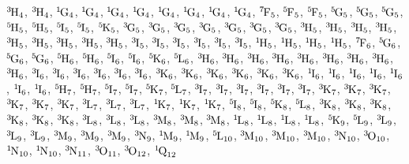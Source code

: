 \begin{mdframed}
\begin{center}
$\LSJterm{3}{H}{4}$, $\LSJterm{3}{H}{4}$, $\LSJterm{1}{G}{4}$, $\LSJterm{1}{G}{4}$, $\LSJterm{1}{G}{4}$, $\LSJterm{1}{G}{4}$, $\LSJterm{1}{G}{4}$, $\LSJterm{1}{G}{4}$, $\LSJterm{1}{G}{4}$, $\LSJterm{1}{G}{4}$, $\LSJterm{7}{F}{5}$, $\LSJterm{5}{F}{5}$, $\LSJterm{5}{F}{5}$, $\LSJterm{5}{G}{5}$, $\LSJterm{5}{G}{5}$, $\LSJterm{5}{G}{5}$, $\LSJterm{5}{H}{5}$, $\LSJterm{5}{H}{5}$, $\LSJterm{5}{I}{5}$, $\LSJterm{5}{I}{5}$, $\LSJterm{5}{K}{5}$, $\LSJterm{3}{G}{5}$, $\LSJterm{3}{G}{5}$, $\LSJterm{3}{G}{5}$, $\LSJterm{3}{G}{5}$, $\LSJterm{3}{G}{5}$, $\LSJterm{3}{G}{5}$, $\LSJterm{3}{G}{5}$, $\LSJterm{3}{H}{5}$, $\LSJterm{3}{H}{5}$, $\LSJterm{3}{H}{5}$, $\LSJterm{3}{H}{5}$, $\LSJterm{3}{H}{5}$, $\LSJterm{3}{H}{5}$, $\LSJterm{3}{H}{5}$, $\LSJterm{3}{H}{5}$, $\LSJterm{3}{H}{5}$, $\LSJterm{3}{I}{5}$, $\LSJterm{3}{I}{5}$, $\LSJterm{3}{I}{5}$, $\LSJterm{3}{I}{5}$, $\LSJterm{3}{I}{5}$, $\LSJterm{3}{I}{5}$, $\LSJterm{1}{H}{5}$, $\LSJterm{1}{H}{5}$, $\LSJterm{1}{H}{5}$, $\LSJterm{1}{H}{5}$, $\LSJterm{7}{F}{6}$, $\LSJterm{5}{G}{6}$, $\LSJterm{5}{G}{6}$, $\LSJterm{5}{G}{6}$, $\LSJterm{5}{H}{6}$, $\LSJterm{5}{H}{6}$, $\LSJterm{5}{I}{6}$, $\LSJterm{5}{I}{6}$, $\LSJterm{5}{K}{6}$, $\LSJterm{5}{L}{6}$, $\LSJterm{3}{H}{6}$, $\LSJterm{3}{H}{6}$, $\LSJterm{3}{H}{6}$, $\LSJterm{3}{H}{6}$, $\LSJterm{3}{H}{6}$, $\LSJterm{3}{H}{6}$, $\LSJterm{3}{H}{6}$, $\LSJterm{3}{H}{6}$, $\LSJterm{3}{H}{6}$, $\LSJterm{3}{I}{6}$, $\LSJterm{3}{I}{6}$, $\LSJterm{3}{I}{6}$, $\LSJterm{3}{I}{6}$, $\LSJterm{3}{I}{6}$, $\LSJterm{3}{I}{6}$, $\LSJterm{3}{K}{6}$, $\LSJterm{3}{K}{6}$, $\LSJterm{3}{K}{6}$, $\LSJterm{3}{K}{6}$, $\LSJterm{3}{K}{6}$, $\LSJterm{3}{K}{6}$, $\LSJterm{1}{I}{6}$, $\LSJterm{1}{I}{6}$, $\LSJterm{1}{I}{6}$, $\LSJterm{1}{I}{6}$, $\LSJterm{1}{I}{6}$, $\LSJterm{1}{I}{6}$, $\LSJterm{1}{I}{6}$, $\LSJterm{5}{H}{7}$, $\LSJterm{5}{H}{7}$, $\LSJterm{5}{I}{7}$, $\LSJterm{5}{I}{7}$, $\LSJterm{5}{K}{7}$, $\LSJterm{5}{L}{7}$, $\LSJterm{3}{I}{7}$, $\LSJterm{3}{I}{7}$, $\LSJterm{3}{I}{7}$, $\LSJterm{3}{I}{7}$, $\LSJterm{3}{I}{7}$, $\LSJterm{3}{I}{7}$, $\LSJterm{3}{K}{7}$, $\LSJterm{3}{K}{7}$, $\LSJterm{3}{K}{7}$, $\LSJterm{3}{K}{7}$, $\LSJterm{3}{K}{7}$, $\LSJterm{3}{K}{7}$, $\LSJterm{3}{L}{7}$, $\LSJterm{3}{L}{7}$, $\LSJterm{3}{L}{7}$, $\LSJterm{1}{K}{7}$, $\LSJterm{1}{K}{7}$, $\LSJterm{1}{K}{7}$, $\LSJterm{5}{I}{8}$, $\LSJterm{5}{I}{8}$, $\LSJterm{5}{K}{8}$, $\LSJterm{5}{L}{8}$, $\LSJterm{3}{K}{8}$, $\LSJterm{3}{K}{8}$, $\LSJterm{3}{K}{8}$, $\LSJterm{3}{K}{8}$, $\LSJterm{3}{K}{8}$, $\LSJterm{3}{K}{8}$, $\LSJterm{3}{L}{8}$, $\LSJterm{3}{L}{8}$, $\LSJterm{3}{L}{8}$, $\LSJterm{3}{M}{8}$, $\LSJterm{3}{M}{8}$, $\LSJterm{3}{M}{8}$, $\LSJterm{1}{L}{8}$, $\LSJterm{1}{L}{8}$, $\LSJterm{1}{L}{8}$, $\LSJterm{1}{L}{8}$, $\LSJterm{5}{K}{9}$, $\LSJterm{5}{L}{9}$, $\LSJterm{3}{L}{9}$, $\LSJterm{3}{L}{9}$, $\LSJterm{3}{L}{9}$, $\LSJterm{3}{M}{9}$, $\LSJterm{3}{M}{9}$, $\LSJterm{3}{M}{9}$, $\LSJterm{3}{N}{9}$, $\LSJterm{1}{M}{9}$, $\LSJterm{1}{M}{9}$, $\LSJterm{5}{L}{10}$, $\LSJterm{3}{M}{10}$, $\LSJterm{3}{M}{10}$, $\LSJterm{3}{M}{10}$, $\LSJterm{3}{N}{10}$, $\LSJterm{3}{O}{10}$, $\LSJterm{1}{N}{10}$, $\LSJterm{1}{N}{10}$, $\LSJterm{3}{N}{11}$, $\LSJterm{3}{O}{11}$, $\LSJterm{3}{O}{12}$, $\LSJterm{1}{Q}{12}$
\end{center}
\end{mdframed}


